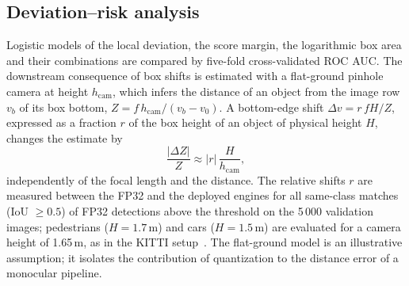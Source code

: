 \documentclass[pdflatex,sn-mathphys-num]{sn-jnl}%
\theoremstyle{thmstyleone}%
\theoremstyle{thmstyletwo}%
\theoremstyle{thmstylethree}%
\begin{document}
\begin{appendices}
\subsection{Deviation--risk analysis}\label{sec:supp-risk}
Logistic models of the local deviation, the score margin, the logarithmic box area and their combinations are compared by five-fold cross-validated ROC AUC. The downstream consequence of box shifts is estimated with a flat-ground pinhole camera at height $h_\mathrm{cam}$, which infers the distance of an object from the image row $v_b$ of its box bottom, $Z=f\,h_\mathrm{cam}/(v_b-v_0)$. A bottom-edge shift $\Delta v=r\,f H/Z$, expressed as a fraction $r$ of the box height of an object of physical height $H$, changes the estimate by
\begin{equation}
\frac{|\Delta Z|}{Z}\approx |r|\,\frac{H}{h_\mathrm{cam}},\label{eq:distance}
\end{equation}
independently of the focal length and the distance. The relative shifts $r$ are measured between the FP32 and the deployed engines for all same-class matches (IoU $\geq 0.5$) of FP32 detections above the threshold on the 5\,000 validation images; pedestrians ($H=1.7$\,m) and cars ($H=1.5$\,m) are evaluated for a camera height of 1.65\,m, as in the KITTI setup~\cite{geiger2012kitti}. The flat-ground model is an illustrative assumption; it isolates the contribution of quantization to the distance error of a monocular pipeline.


\end{appendices}
\end{document}
